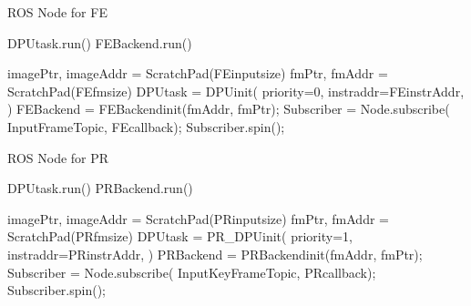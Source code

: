 \begin{algorithm}[t]
    \caption{ ROS Node for FE }
    \label{code:FE}
    \begin{algorithmic}[1]
        \State DPUtask.run()
        \State FEBackend.run()
        \EndFunction

        \State imagePtr, imageAddr = ScratchPad(FEinputsize)
        \State fmPtr, fmAddr = ScratchPad(FEfmsize)
        \State DPUtask = DPUinit({\color{red}  priority=0},{\color{blue} instraddr=FEinstrAddr, }
        \State \qquad \qquad \qquad {} ) 
        \State FEBackend = FEBackendinit({\color{blue}fmAddr, fmPtr});
        \State Subscriber = Node.subscribe( InputFrameTopic, FEcallback);
        \State Subscriber.spin();
        \EndFunction
    \end{algorithmic}
\end{algorithm}

\begin{algorithm}[t]
    \caption{ ROS Node for PR }
    \label{code:PR}
    \begin{algorithmic}[1]
        \State DPUtask.run()
        \State PRBackend.run()
        \EndFunction

        \State imagePtr, imageAddr = ScratchPad(PRinputsize)
        \State fmPtr, fmAddr = ScratchPad(PRfmsize)
        \State DPUtask = PR\_DPUinit( {\color{red} priority=1},{\color{blue} instraddr=PRinstrAddr}, 
        \State \qquad \qquad \qquad {} ) 
        \State PRBackend = PRBackendinit({\color{blue}fmAddr, fmPtr});
        \State Subscriber = Node.subscribe( InputKeyFrameTopic, PRcallback);
        \State Subscriber.spin();
        \EndFunction
    \end{algorithmic}
\end{algorithm}

